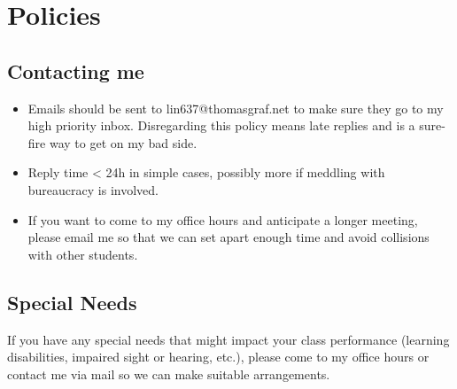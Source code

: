 \section{Policies}

\subsection{Contacting me}
\begin{itemize}
    \item Emails should be sent to lin637@thomasgraf.net to make sure they go to my high priority inbox.
        Disregarding this policy means late replies and is a sure-fire way to get on my bad side.
    \item Reply time < 24h in simple cases, possibly more if meddling with bureaucracy is involved.
    \item If you want to come to my office hours and anticipate a longer meeting, please email me so that we can set apart enough time and avoid collisions with other students.
\end{itemize}

\subsection{Special Needs}
If you have any special needs that might impact your class performance (learning disabilities, impaired sight or hearing, etc.), please come to my office hours or contact me via mail so we can make suitable arrangements.
